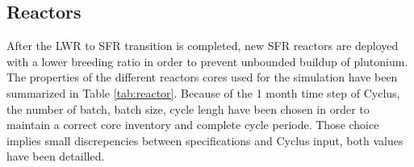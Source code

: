 \documentclass[12pt]{article}
\begin{document}
\subsection{Reactors}

After the LWR to SFR transition is completed, new SFR reactors are deployed
with a lower breeding ratio in order to prevent unbounded buildup of
plutonium. The properties of the different reactors cores used for the
simulation have been summarized in Table \ref{tab:reactor}. Because of the 1
month time step of Cyclus, the number of batch, batch size, cycle lengh have been
chosen in order to maintain a correct core inventory and complete cycle
periode. Those choice implies small discrepencies between specifications and
Cyclus input, both values have been detailled. 

\end{document}
